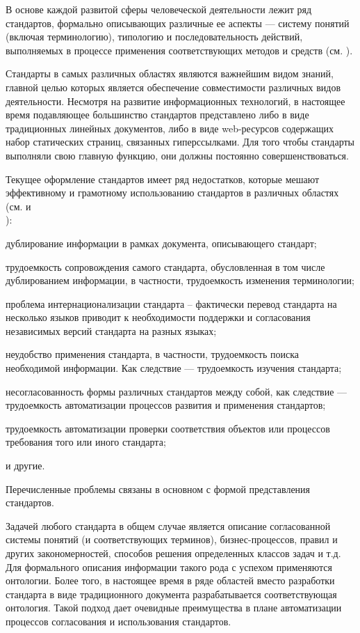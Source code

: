 В основе каждой развитой сферы человеческой деятельности лежит ряд стандартов, формально описывающих различные ее аспекты --- систему понятий (включая терминологию), типологию и последовательность действий, выполняемых в процессе применения соответствующих методов и средств (см. ).

Стандарты в самых различных областях являются важнейшим видом знаний, главной целью которых является обеспечение совместимости различных видов деятельности.  Несмотря на развитие информационных технологий, в настоящее время подавляющее большинство стандартов представлено либо в виде традиционных линейных документов, либо в виде web-ресурсов содержащих набор статических страниц, связанных гиперссылками. Для того чтобы стандарты выполняли свою главную функцию, они должны постоянно совершенствоваться. 

Текущее оформление стандартов имеет ряд недостатков, которые мешают эффективному и грамотному использованию стандартов в различных областях (см.  и \\ ):
\begin{textitemize}
	\item дублирование информации в рамках документа, описывающего стандарт;
	\item трудоемкость сопровождения самого стандарта, обусловленная в том числе дублированием информации, в частности, трудоемкость изменения терминологии;
	\item проблема интернационализации стандарта -- фактически перевод стандарта на несколько языков приводит к необходимости поддержки и согласования независимых версий стандарта на разных языках;
	\item неудобство применения стандарта, в частности, трудоемкость поиска необходимой информации. Как следствие --- трудоемкость изучения стандарта;
	\item несогласованность формы различных стандартов между собой, как следствие --- трудоемкость автоматизации процессов развития и применения стандартов;
	\item трудоемкость автоматизации проверки соответствия объектов или процессов требования того или иного стандарта;
	\item  и другие.
\end{textitemize}

Перечисленные проблемы связаны в основном с формой представления стандартов. 

Задачей любого стандарта в общем случае является описание согласованной системы понятий (и соответствующих терминов), бизнес-процессов, правил и других закономерностей, способов решения определенных классов задач и т.д. Для формального описания информации такого рода с успехом применяются онтологии. Более того, в настоящее время в ряде областей вместо разработки стандарта в виде традиционного документа разрабатывается соответствующая онтология. Такой подход дает очевидные преимущества в плане автоматизации процессов согласования и использования стандартов.

